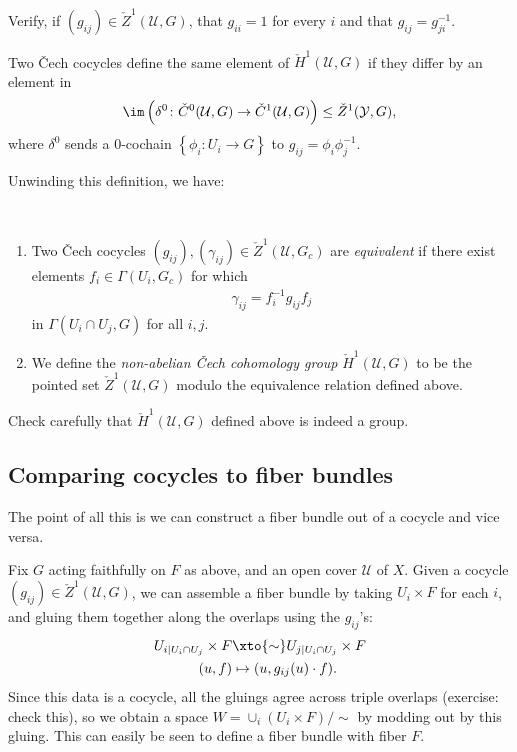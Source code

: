 \documentclass[11pt]{amsart}
\begin{document}
\begin{exercise} Verify, if $(g_{ij}) \in \check{Z}^1(\mathcal{U},G)$, that $g_{ii} = 1$ for every $i$ and that $g_{ij} = g_{ji}^{-1}$.
\end{exercise}

Two \v{C}ech cocycles define the same element of $\check{H}^1(\mathcal{U},G)$ if they differ by an element in 
\[
\im \left( \delta^0 \colon \check{C}^0(\mathcal{U},G) \to \check{C}^1(\mathcal{U},G) \right) \le \check{Z}^1(\mathcal{Y},G),\]
where $\delta^0$ sends a $0$-cochain $\left\{ \phi_i \colon U_i \to G \right\}$ to $g_{ij} = \phi_i \phi_j^{-1}$.

Unwinding this definition, we have:

\begin{definition}\label{def:non-abelian-cech-h1} \,
\begin{enumerate}
    \item Two \v{C}ech cocycles $(g_{ij}), (\gamma_{ij}) \in \check{Z}^1(\mathcal{U},G_c)$ are \emph{equivalent} if there exist elements $f_i \in \Gamma(U_i,G_c)$ for which
    \begin{align*}
        \gamma_{ij} = f_i^{-1} g_{ij} f_j
    \end{align*}
    in $\Gamma(U_i\cap U_j,G)$ for all $i,j$.
    \item We define the \emph{non-abelian \v{C}ech cohomology group} $\check{H}^1(\mathcal{U},G)$ to be the pointed set $\check{Z}^1(\mathcal{U},G)$ modulo the equivalence relation defined above.
\end{enumerate}
\end{definition}

\begin{exercise} Check carefully that $\check{H}^1(\mathcal{U},G)$ defined above is indeed a group.
\end{exercise}

\subsection{Comparing cocycles to fiber bundles}

The point of all this is we can construct a fiber bundle out of a cocycle and vice versa.

\begin{construction}
\label{constr:fiber-bundle-from-cocycle}
Fix $G$ acting faithfully on $F$ as above, and an open cover $\mathcal{U}$ of $X$. Given a cocycle $(g_{ij})\in \check{Z}^1(\mathcal{U},G)$, we can assemble a fiber bundle by taking $U_i \times F$ for each $i$, and gluing them together along the overlaps using the $g_{ij}$'s:
\begin{align*}
    U_{i|U_i\cap U_j} \times F &\xto{\sim} U_{j|U_i\cap U_j} \times F \\
    (u,f) &\mapsto (u, g_{ij}(u)\cdot f).
\end{align*}
%
Since this data is a cocycle, all the gluings agree across triple overlaps (exercise: check this), so we obtain a space $W = \cup_i (U_i \times F) /\sim$ by modding out by this gluing. This can easily be seen to define a fiber bundle with fiber $F$.
\end{construction}
\end{document}
